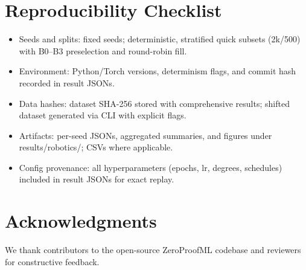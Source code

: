\documentclass[11pt,twoside]{article}
\begin{document}
\section{Reproducibility Checklist}
\begin{itemize}
  \item Seeds and splits: fixed seeds; deterministic, stratified quick subsets (2k/500) with B0--B3 preselection and round-robin fill.
  \item Environment: Python/Torch versions, determinism flags, and commit hash recorded in result JSONs.
  \item Data hashes: dataset SHA-256 stored with comprehensive results; shifted dataset generated via CLI with explicit flags.
  \item Artifacts: per-seed JSONs, aggregated summaries, and figures under results/robotics/; CSVs where applicable.
  \item Config provenance: all hyperparameters (epochs, lr, degrees, schedules) included in result JSONs for exact replay.
\end{itemize}

\section*{Acknowledgments}
We thank contributors to the open-source ZeroProofML codebase and reviewers for constructive feedback.


\end{document}
